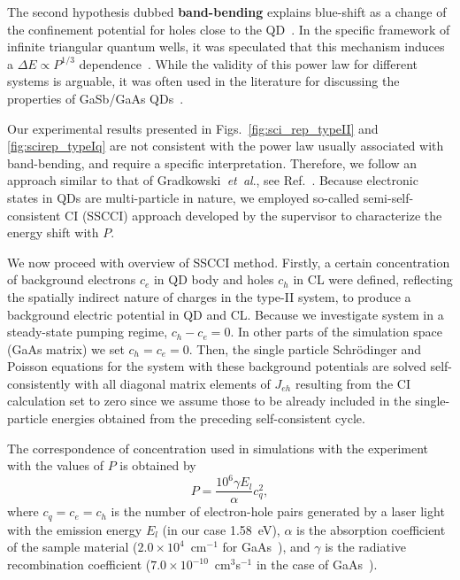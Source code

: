 The second hypothesis dubbed \textbf{band-bending} explains blue-shift as a change of the confinement potential for holes close to the QD~\citep{LiuSteer,Jin,Hatami1998,Jo2012}. In the specific framework of infinite triangular quantum wells, it was speculated that this mechanism induces a $\Delta E \propto P^{1/3}$ dependence~\cite{Ledentsov1995,Kuokstis2002,Jo2012}. While the validity of this power law for different systems is arguable, it was often used in the literature for discussing the properties of GaSb/GaAs QDs~\cite{HATAMI1995,Hatami1998}.

Our experimental results presented in Figs.~\ref{fig:sci_rep_typeII} and \ref{fig:scirep_typeIq} are not consistent with the power law usually associated with band-bending, and require a specific interpretation. Therefore, we follow an approach similar to that of Gradkowski\textit{~et~al}., see Ref.~\citep{Gradkowski2012}. Because electronic states in QDs are multi-particle in nature, we employed so-called semi-self-consistent CI (SSCCI) approach developed by the supervisor to characterize the energy shift with $P$.

We now proceed with overview of SSCCI method. Firstly, a certain concentration of background electrons $c_e$ in QD body and holes $c_h$ in CL were defined, reflecting the spatially indirect nature of charges in the type-II system, to produce a background electric potential in QD and CL. Because we investigate system in a steady-state pumping regime, $c_h-c_e=0$. In other parts of the simulation space (GaAs matrix) we set $c_h=c_e=0$. Then, the single particle Schrödinger and Poisson equations for the system with these background potentials are solved self-consistently with all diagonal matrix elements of $J_{eh}$ resulting from the CI calculation set to zero since we assume those to be already included in the single-particle energies obtained from the preceding self-consistent cycle.

The correspondence of concentration used in simulations with the experiment with the values of $P$ is obtained by~\cite{Kuokstis2002}
%
\begin{equation}
\label{eq:conc_to_P_recalc}
P=\frac{10^6\gamma E_{l}}{\alpha}c_q^2,
\end{equation}
where $c_q=c_e=c_h$ is the number of electron-hole pairs generated by a laser light with the emission energy $E_l$ (in our case 1.58~eV), $\alpha$ is the absorption coefficient of the sample material ($2.0\times 10^4$~cm$^{-1}$ for GaAs~\cite{landoltbornstein}), and $\gamma$ is the radiative recombination coefficient ($7.0\times 10^{-10}$~cm$^3$s$^{-1}$ in the case of GaAs~\cite{landoltbornstein}).

